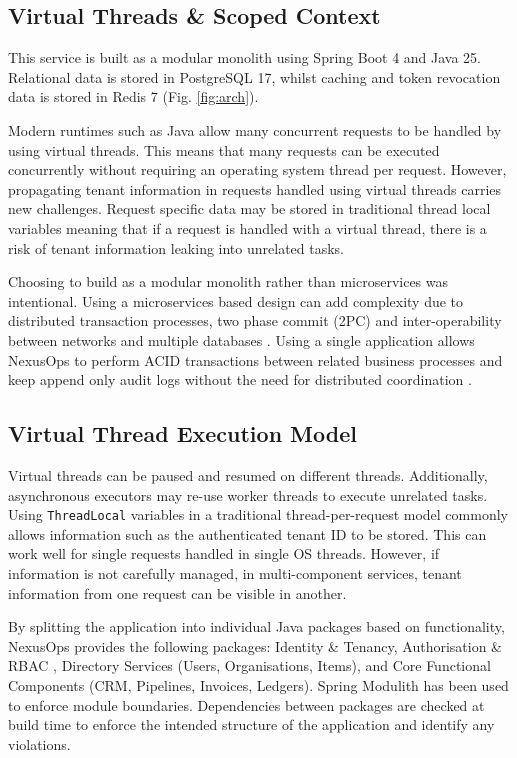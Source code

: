\documentclass[conference]{IEEEtran}
\begin{document}
\subsection{Virtual Threads \& Scoped Context}
This service is built as a modular monolith using Spring Boot 4 and Java 25. Relational data is stored in PostgreSQL 17, whilst caching and token revocation data is stored in Redis 7 (Fig. \ref{fig:arch}).

Modern runtimes such as Java allow many concurrent requests to be handled by using virtual threads. This means that many requests can be executed concurrently without requiring an operating system thread per request. However, propagating tenant information in requests handled using virtual threads carries new challenges. Request specific data may be stored in traditional thread local variables meaning that if a request is handled with a virtual thread, there is a risk of tenant information leaking into unrelated tasks.

Choosing to build as a modular monolith rather than microservices was intentional. Using a microservices based design can add complexity due to distributed transaction processes, two phase commit (2PC) and inter-operability between networks and multiple databases \cite{dragoni2017}. Using a single application allows NexusOps to perform ACID transactions between related business processes and keep append only audit logs without the need for distributed coordination \cite{richardson2018, newman2019}.

\subsection{Virtual Thread Execution Model}
Virtual threads can be paused and resumed on different threads. Additionally, asynchronous executors may re-use worker threads to execute unrelated tasks. Using \texttt{ThreadLocal} variables in a traditional thread-per-request model commonly allows information such as the authenticated tenant ID to be stored. This can work well for single requests handled in single OS threads. However, if information is not carefully managed, in multi-component services, tenant information from one request can be visible in another.

By splitting the application into individual Java packages based on functionality, NexusOps provides the following packages: Identity \& Tenancy, Authorisation \& RBAC \cite{sandhu1996}, Directory Services (Users, Organisations, Items), and Core Functional Components (CRM, Pipelines, Invoices, Ledgers). Spring Modulith has been used to enforce module boundaries. Dependencies between packages are checked at build time to enforce the intended structure of the application and identify any violations.
\end{document}
